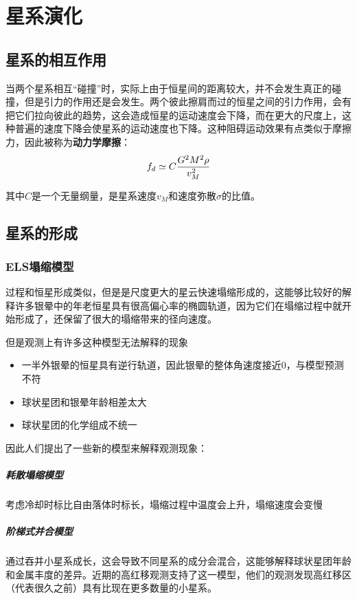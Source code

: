 \chapter{星系演化}
\section{星系的相互作用}
当两个星系相互``碰撞''时，实际上由于恒星间的距离较大，并不会发生真正的碰撞，但是引力的作用还是会发生。两个彼此擦肩而过的恒星之间的引力作用，会有把它们拉向彼此的趋势，这会造成恒星的运动速度会下降，而在更大的尺度上，这种普遍的速度下降会使星系的运动速度也下降。这种阻碍运动效果有点类似于摩擦力，因此被称为\textbf{动力学摩擦}：
\begin{equation}
  f_d\simeq C{G^2M^2\rho \over v_M^2}
\end{equation}

其中$C$是一个无量纲量，是星系速度$v_M$和速度弥散$\sigma$的比值。

\section{星系的形成}
\subsection{ELS塌缩模型}
过程和恒星形成类似，但是是尺度更大的星云快速塌缩形成的，这能够比较好的解释许多银晕中的年老恒星具有很高偏心率的椭圆轨道，因为它们在塌缩过程中就开始形成了，还保留了很大的塌缩带来的径向速度。

但是观测上有许多这种模型无法解释的现象
\begin{itemize}
  \item 一半外银晕的恒星具有逆行轨道，因此银晕的整体角速度接近0，与模型预测不符
  \item 球状星团和银晕年龄相差太大
  \item 球状星团的化学组成不统一
\end{itemize}

因此人们提出了一些新的模型来解释观测现象：
\paragraph{耗散塌缩模型}
考虑冷却时标比自由落体时标长，塌缩过程中温度会上升，塌缩速度会变慢

\paragraph{阶梯式并合模型}
通过吞并小星系成长，这会导致不同星系的成分会混合，这能够解释球状星团年龄和金属丰度的差异。近期的高红移观测支持了这一模型，他们的观测发现高红移区（代表很久之前）具有比现在更多数量的小星系。

